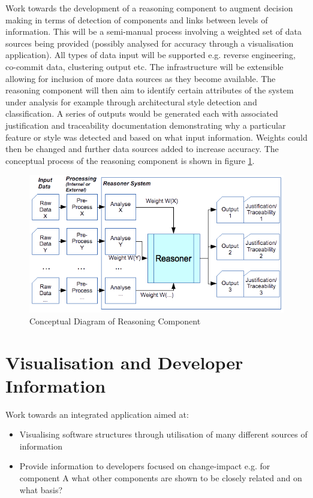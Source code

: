 Work towards the development of a reasoning component to augment decision making in terms of detection of components and links between levels of information. This will be a semi-manual process involving a weighted set of data sources being provided (possibly analysed for accuracy through a visualisation application). All types of data input will be supported e.g. reverse engineering, co-commit data, clustering output etc. The infrastructure will be extensible allowing for inclusion of more data sources as they become available. The reasoning component will then aim to identify certain attributes of the system under analysis for example through architectural style detection and classification. A series of outputs would be generated each with associated justification and traceability documentation demonstrating why a particular feature or style was detected and based on what input information. Weights could then be changed and further data sources added to increase accuracy. The conceptual process of the reasoning component is shown in figure \ref{fig-reasoning-component}.

\begin{figure}[htb!]
\centering
\includegraphics[scale=0.7]{sections/future/ReasonerDiagram}
\caption{Conceptual Diagram of Reasoning Component}
\label{fig-reasoning-component}
\end{figure}

\section{Visualisation and Developer Information}

Work towards an integrated application aimed at:

\begin{itemize}
\item Visualising software structures through utilisation of many different sources of information
\item Provide information to developers focused on change-impact e.g. for component A what other components are shown to be closely related and on what basis?
\end{itemize}

